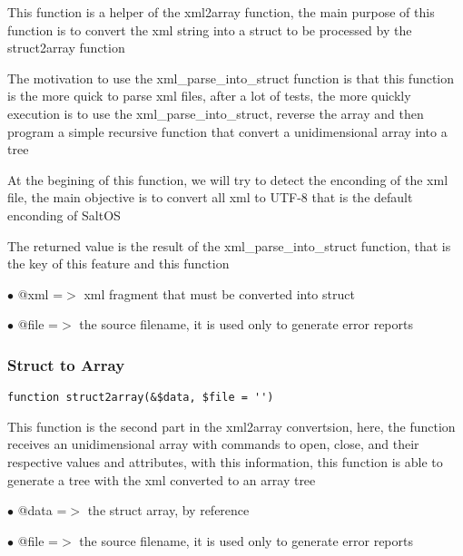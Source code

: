 \documentclass[a4paper]{article}
\begin{document}
This function is a helper of the xml2array function, the main purpose of this
function is to convert the xml string into a struct to be processed by the
struct2array function

The motivation to use the xml\_parse\_into\_struct function is that this function
is the more quick to parse xml files, after a lot of tests, the more quickly
execution is to use the xml\_parse\_into\_struct, reverse the array and then
program a simple recursive function that convert a unidimensional array into
a tree

At the begining of this function, we will try to detect the enconding of the
xml file, the main objective is to convert all xml to UTF-8 that is the default
enconding of SaltOS

The returned value is the result of the xml\_parse\_into\_struct function, that is
the key of this feature and this function

\begin{compactitem}
\item[\color{myblue}$\bullet$] @xml  =$>$ xml fragment that must be converted into struct
\item[\color{myblue}$\bullet$] @file =$>$ the source filename, it is used only to generate error reports
\end{compactitem}

\hypertarget{toc282}{}
\subsubsection{Struct to Array}

\begin{lstlisting}
function struct2array(&$data, $file = '')
\end{lstlisting}

This function is the second part in the xml2array convertsion, here, the function
receives an unidimensional array with commands to open, close, and their respective
values and attributes, with this information, this function is able to generate a
tree with the xml converted to an array tree

\begin{compactitem}
\item[\color{myblue}$\bullet$] @data =$>$ the struct array, by reference
\item[\color{myblue}$\bullet$] @file =$>$ the source filename, it is used only to generate error reports
\end{compactitem}
\end{document}
